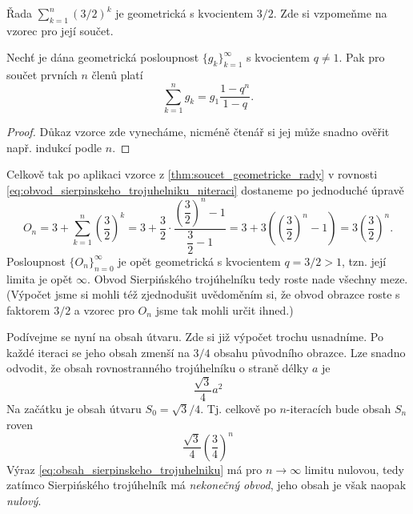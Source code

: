 Řada $\sum_{k=1}^{n}(3/2)^k$ je geometrická s kvocientem $3/2$. Zde si vzpomeňme na vzorec pro její součet.
\begin{theorem}\label{thm:soucet_geometricke_rady}
    Nechť je dána geometrická posloupnost $\{g_k\}_{k=1}^\infty$ s kvocientem $q\neq 1$. Pak pro součet prvních $n$ členů platí
    \begin{equation*}
        \sum_{k=1}^{n}{g_k}=g_1\dfrac{1-q^n}{1-q}.
    \end{equation*}
\end{theorem}
\begin{proof}
    Důkaz vzorce zde vynecháme, nicméně čtenář si jej může snadno ověřit např. indukcí podle $n$. 
\end{proof}
Celkově tak po aplikaci vzorce z \ref{thm:soucet_geometricke_rady} v rovnosti \eqref{eq:obvod_sierpinskeho_trojuhelniku_niteraci} dostaneme po jednoduché úpravě
\begin{equation*}
    O_n=3+\sum_{k=1}^n{\left(\dfrac{3}{2}\right)^k}=3+\dfrac{3}{2}\cdot\dfrac{\left(\dfrac{3}{2}\right)^n-1}{\dfrac{3}{2}-1}=3+3\left(\left(\dfrac{3}{2}\right)^n-1\right)=3\left(\dfrac{3}{2}\right)^n.
\end{equation*}
Posloupnost $\{O_n\}_{n=0}^\infty$ je opět geometrická s kvocientem $q=3/2>1$, tzn. její limita je opět $\infty$. Obvod Sierpińského trojúhelníku tedy roste nade všechny meze. (Výpočet jsme si mohli též zjednodušit uvědoměním si, že obvod obrazce roste s faktorem $3/2$ a vzorec pro $O_n$ jsme tak mohli určit ihned.)\par
Podívejme se nyní na obsah útvaru. Zde si již výpočet trochu usnadníme. Po každé iteraci se jeho obsah zmenší na $3/4$ obsahu původního obrazce. Lze snadno odvodit, že obsah rovnostranného trojúhelníku o straně délky $a$ je
\begin{equation*}
    \dfrac{\sqrt{3}}{4}a^2
\end{equation*}
Na začátku je obsah útvaru $S_0=\sqrt{3}/4$. Tj. celkově po $n$-iteracích bude obsah $S_n$ roven
\begin{equation}\label{eq:obsah_sierpinskeho_trojuhelniku}
    \dfrac{\sqrt{3}}{4}\left(\dfrac{3}{4}\right)^n
\end{equation}
Výraz \eqref{eq:obsah_sierpinskeho_trojuhelniku} má pro $n\to\infty$ limitu nulovou, tedy zatímco Sierpińského trojúhelník má \emph{nekonečný obvod}, jeho obsah je však naopak \emph{nulový}.

